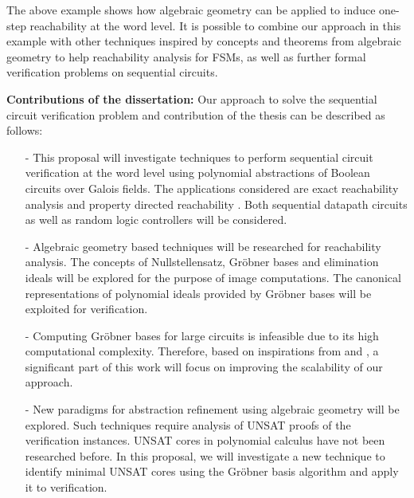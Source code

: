 The above example shows how algebraic geometry can be applied to induce one-step reachability at the word level. 
It is possible to combine our approach in this example with other techniques inspired by concepts and theorems
from algebraic geometry to help reachability analysis for FSMs, as well as further formal verification problems
on sequential circuits.

{\bf Contributions of the dissertation:} Our approach to solve the sequential circuit verification problem and contribution
of the thesis can be described as follows:
\begin{itemize}
\item[-] This proposal will investigate techniques to perform sequential circuit verification at the word level
using polynomial abstractions of Boolean circuits over Galois fields. The applications considered are exact
reachability analysis and property directed reachability \cite{bradley2011sat} \cite{bradley2011incremental}. Both sequential datapath circuits
as well as random logic controllers will be considered. 
\item[-] Algebraic geometry based techniques will be researched for reachability analysis. 
The concepts of Nullstellensatz, Gr\"obner bases and elimination ideals will be explored for 
the purpose of image computations. The canonical representations of polynomial ideals provided
by Gr\"obner bases will be exploited for verification.
\item[-] Computing Gr\"obner bases for large circuits is infeasible due to its high computational complexity.
Therefore, based on inspirations from \cite{timDAC} and \cite{jinpeng}, a significant part of this work will focus on improving the scalability of our approach.
\item[-] New paradigms for abstraction refinement using algebraic geometry will be explored.
Such techniques require analysis of UNSAT proofs of the verification instances.
UNSAT cores in polynomial calculus have not been researched before. In this proposal,
we will investigate a new technique to identify minimal UNSAT cores using the Gr\"obner basis algorithm 
and apply it to verification.
\end{itemize}
